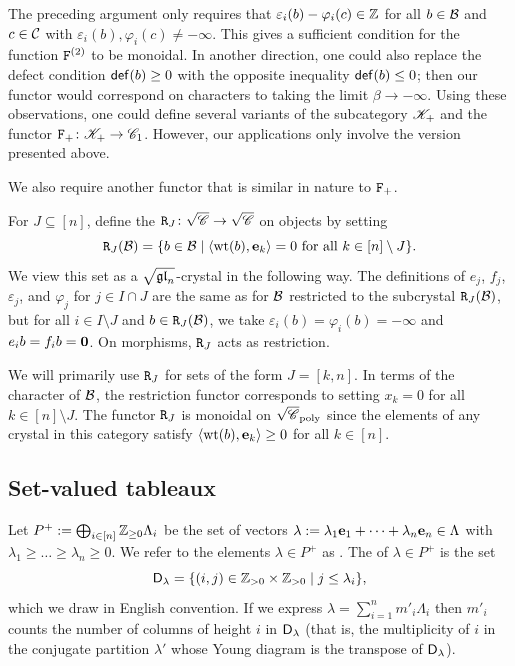 \documentclass[11pt]{article}
\begin{document}
\begin{remark}
\label{rem:functor_genalization}
The preceding argument only requires that $\varepsilon_i(b) - \varphi_i(c) \in \ZZ$ for all $b \in \cB$ and $c \in \cC$ with $\varepsilon_i(b), \varphi_i(c)\neq -\infty$.
This gives a sufficient condition for the function $\powF{2}$ to be monoidal.
In another direction, one could also replace the defect condition $\defect(b)\geq 0$ with the opposite inequality $\defect(b)\leq 0$; then our functor would correspond on characters to taking the limit $\beta\to -\infty$.
Using these observations, one could define several variants of the subcategory $\sK_+$ and the functor $\defectF{2} \colon \sK_+ \to \sC_1$.
However, our applications only involve the version presented above.
\end{remark}



We also require another functor that is similar in nature to $\defectF{2}$.

\begin{definition}
For $J \subseteq [n]$, define the  $\restrictF{J} \colon  \sqrt{\sC} \to \sqrt{\sC}$ on objects by setting 
\[
\restrictF{J}(\cB) = \{b \in \cB \mid \langle \weight(b), \e_k \rangle = 0\text{ for all $k \in [n] \setminus J$}\}.
\]
We view this set as a $\sqgln$-crystal in the following way.
The definitions of $e_j$, $f_j$, $\varepsilon_j$, and $\varphi_j$ for $ j \in I \cap J$ are the same as for $\cB$ restricted to the subcrystal $\restrictF{J}(\cB)$, but for all $i \in I \setminus J$ and $b \in \restrictF{J}(\cB)$, we take $\varepsilon_i(b)= \varphi_i(b) = -\infty$ and $e_i b = f_i b = \zero$.
On morphisms, $\restrictF{J}$ acts as restriction.
\end{definition}

We will primarily use $\restrictF{J}$ for sets of the form $J = [k,n]$.
In terms of the character of $\cB$, the restriction functor corresponds to setting $x_k = 0$ for all $k \in [n] \setminus J$.
The functor $\restrictF{J}$ is monoidal on $\sqrt{\sC}_{\poly}$ since the elements of any crystal in this category satisfy $\langle \weight(b),\e_k\rangle\geq 0$ for all $k \in [n]$.
 


\subsection{Set-valued tableaux}

Let $P^+ := \bigoplus_{i \in [n]} \ZZ_{\geq 0} \Lambda_i$ be the set of vectors
$
\lambda := \lambda_1 \e_1 +  \cdots + \lambda_n \e_n \in \Lambda
$
with $\lambda_1\geq  \dots \geq \lambda_n \geq0$.
We refer to the elements $\lambda \in P^+$ as .
The   of  $\lambda \in P^+$ is the set
\[
\D_{\lambda} = \{ (i,j) \in \ZZ_{>0} \times \ZZ_{>0} \mid j\leq\lambda_i\},
\]
which we draw in English convention.
If we express $\lambda = \sum_{i=1}^n m'_i \Lambda_i$ then $m'_i$ counts the number of columns of height $i$ in $\D_\lambda$ (that is, the multiplicity of $i$ in the conjugate partition $\lambda'$ whose Young diagram is the transpose of $\D_\lambda$).
\end{document}
